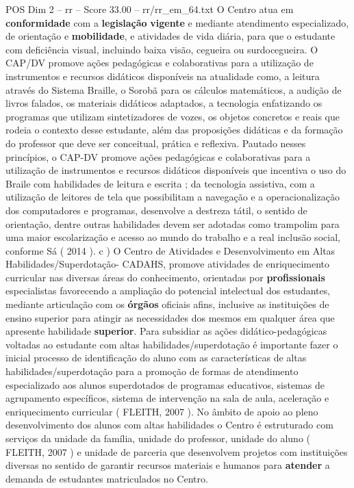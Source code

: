 \begin{textsample}{POS Dim 2 – rr – Score 33.00 – rr/rr\_em\_64.txt}
O Centro atua em \textbf{conformidade} com a \textbf{legislação} \textbf{vigente} e mediante atendimento especializado, de orientação e \textbf{mobilidade}, e atividades de vida diária, para que o estudante com deficiência visual, incluindo baixa visão, cegueira ou surdocegueira.
O CAP/DV promove ações pedagógicas e colaborativas para a utilização de instrumentos e recursos didáticos disponíveis na atualidade como, a leitura através do Sistema Braille, o Sorobã para os cálculos matemáticos, a audição de livros falados, os materiais didáticos adaptados, a tecnologia enfatizando os programas que utilizam sintetizadores de vozes, os objetos concretos e reais que rodeia o contexto desse estudante, além das proposições didáticas e da formação do professor que deve ser conceitual, prática e reflexiva.
Pautado nesses princípios, o CAP-DV promove ações pedagógicas e colaborativas para a utilização de instrumentos e recursos didáticos disponíveis que incentiva o uso do Braile com habilidades de leitura e escrita ; da tecnologia assistiva, com a utilização de leitores de tela que possibilitam a navegação e a operacionalização dos computadores e programas, desenvolve a destreza tátil, o sentido de orientação, dentre outras habilidades devem ser adotadas como trampolim para uma maior escolarização e acesso ao mundo do trabalho e a real inclusão social, conforme Sá ( 2014 ). c ) O Centro de Atividades e Desenvolvimento em Altas Habilidades/Superdotação- CADAHS, promove atividades de enriquecimento curricular nas diversas áreas do conhecimento, orientadas por \textbf{profissionais} especialistas favorecendo a ampliação do potencial intelectual dos estudantes, mediante articulação com os \textbf{órgãos} oficiais afins, inclusive as instituições de ensino superior para atingir as necessidades dos mesmos em qualquer área que apresente habilidade \textbf{superior}.
Para subsidiar as ações didático-pedagógicas voltadas ao estudante com altas habilidades/superdotação é importante fazer o inicial processo de identificação do aluno com as características de altas habilidades/superdotação para a promoção de formas de atendimento especializado aos alunos superdotados de programas educativos, sistemas de agrupamento específicos, sistema de intervenção na sala de aula, aceleração e enriquecimento curricular ( FLEITH, 2007 ).
No âmbito de apoio ao pleno desenvolvimento dos alunos com altas habilidades o Centro é estruturado com serviços da unidade da família, unidade do professor, unidade do aluno ( FLEITH, 2007 ) e unidade de parceria que desenvolvem projetos com instituições diversas no sentido de garantir recursos materiais e humanos para \textbf{atender} a demanda de estudantes matriculados no Centro.

\end{textsample}
